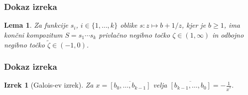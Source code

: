 \documentclass{beamer}
\newtheorem{izrek}[theorem]{Izrek}
\newtheorem{lema}[theorem]{Lema}
\begin{document}
\begin{frame}
\frametitle{Dokaz izreka}
\begin{lema}
    Za funkcije $s_i$, $i \in \{1, \ldots, k\}$ oblike $s : z \mapsto b + 1/z$, kjer je $b \geq 1$, ima končni kompozitum $S = s_1 \cdots s_k$ privlačno negibno točko $\zeta \in (1, \infty)$ in odbojno negibno točko $\tilde{\zeta} \in (-1, 0)$. 
\end{lema}

\end{frame}
\begin{frame}
\frametitle{Dokaz izreka}
\begin{izrek}[Galois-ev izrek]
    Za $x = \overline{[b_0, \ldots, b_{k-1}]}$ velja $\overline{[b_{k-1}, \ldots, b_0]} = - \frac{1}{x^*}.$
\end{izrek}

\end{frame}

\end{document}
